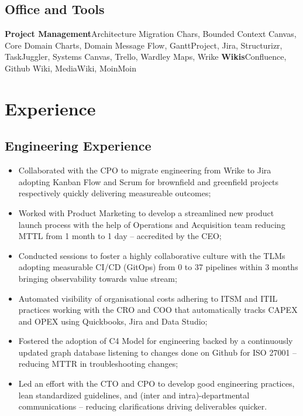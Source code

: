 \documentclass[11pt,a4paper,nolmodern,colorlinks=true,linkcolor=true]{moderncv}
\begin{document}
\subsection{Office and Tools}
           {\textbf{Project Management}}{Architecture Migration Chars, Bounded Context Canvas, Core Domain Charts, Domain Message Flow, GanttProject, Jira, Structurizr, TaskJuggler, Systems Canvas, Trello, Wardley Maps, Wrike}
           {\textbf{Wikis}}{Confluence, Github Wiki, MediaWiki, MoinMoin}

\newpage

\section{Experience}

\subsection{Engineering Experience}

%
  {
    \begin{itemize}
      \item Collaborated with the CPO to migrate engineering from Wrike to Jira adopting Kanban Flow  and Scrum for brownfield and greenfield projects respectively quickly delivering measureable outcomes;
      \item Worked with Product Marketing to develop a streamlined new product launch process with the help of Operations and Acquisition team reducing MTTL from 1 month to 1 day -- accredited by the CEO;
      \item Conducted sessions to foster a highly collaborative culture with the TLMs adopting measurable CI/CD (GitOps) from 0 to 37 pipelines within 3 months bringing observability towards value stream;
      \item Automated visibility of organisational costs adhering to ITSM and ITIL practices working with the CRO and COO that automatically tracks CAPEX and OPEX using Quickbooks, Jira and Data Studio;
      \item Fostered the adoption of C4 Model for engineering backed by a continuously updated graph database listening to changes done on Github for ISO 27001 -- reducing MTTR in troubleshooting changes;
      \item Led an effort with the CTO and CPO to develop good engineering practices, lean standardized guidelines, and (inter and intra)-departmental communications -- reducing clarifications driving deliverables quicker.
    \end{itemize}
}
\end{document}
